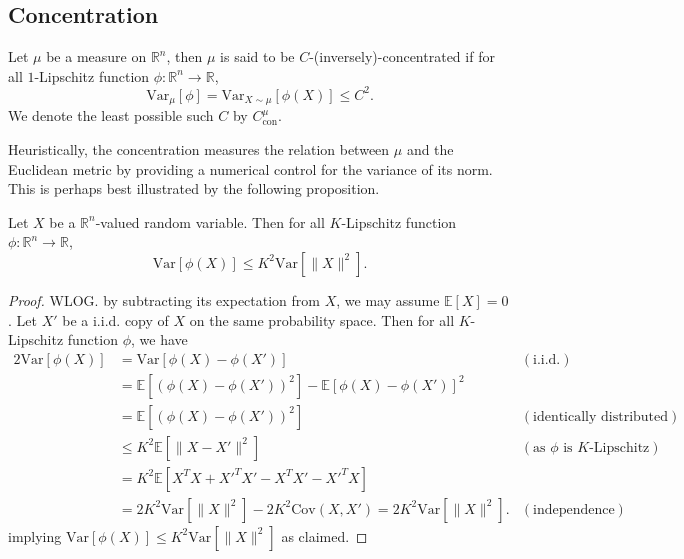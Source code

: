 


\subsection{Concentration}

\begin{definition}
  Let \(\mu\) be a measure on \(\mathbb{R}^n\), then \(\mu\) is said to be \(C\)-(inversely)-concentrated if
  for all \(1\)-Lipschitz function \(\phi : \mathbb{R}^n \to \mathbb{R}\), 
  \begin{equation}
    \text{Var}_\mu[\phi] = \text{Var}_{X \sim \mu}[\phi(X)] \le C^2.
  \end{equation}
  We denote the least possible such \(C\) by \(C^\mu_{\text{con}}\).
\end{definition}

Heuristically, the concentration measures the relation between \(\mu\) and the Euclidean metric by 
providing a numerical control for the variance of its norm. This is perhaps best illustrated by the following proposition.

\begin{proposition}
  Let \(X\) be a \(\mathbb{R}^n\)-valued random variable. Then for all \(K\)-Lipschitz function 
  \(\phi : \mathbb{R}^n \to \mathbb{R}\),
  \[\text{Var}[\phi(X)] \le K^2 \text{Var}[\|X\|^2].\]
\end{proposition}
\begin{proof}
  WLOG. by subtracting its expectation from \(X\), we may assume \(\mathbb{E}[X] = 0\).
  Let \(X'\) be a i.i.d. copy of \(X\) on the same probability space. Then for all \(K\)-Lipschitz 
  function \(\phi\), we have 
  \begin{align*}
    2 \text{Var}[\phi(X)] & = \text{Var}[\phi(X) - \phi(X')] & (\text{i.i.d.})\\
      & = \mathbb{E}[(\phi(X) - \phi(X'))^2] - \mathbb{E}[\phi(X) - \phi(X')]^2 & \\
      & = \mathbb{E}[(\phi(X) - \phi(X'))^2] & (\text{identically distributed}) \\
      & \le K^2 \mathbb{E}[\|X - X'\|^2] & (\text{as \(\phi\) is \(K\)-Lipschitz}) \\
      & = K^2 \mathbb{E}[X^T X + X'^T X' - X^T X' - X'^T X] & \\
      & = 2K^2 \text{Var}[\|X\|^2] - 2K^2 \text{Cov}(X, X') = 2K^2 \text{Var}[\|X\|^2]. & (\text{independence})
  \end{align*}
  implying \(\text{Var}[\phi(X)] \le K^2 \text{Var}[\|X\|^2]\) as claimed.
\end{proof}

